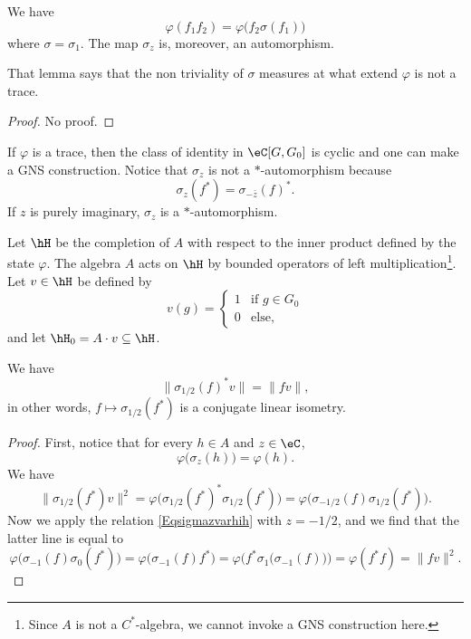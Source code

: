 \begin{lemma}
	We have
	\begin{equation}
		\varphi(f_1f_2)=\varphi\big( f_2\sigma(f_1) \big)
	\end{equation}
	where $\sigma=\sigma_1$. The map $\sigma_z$ is, moreover, an automorphism.
\end{lemma}
That lemma says that the non triviality of $\sigma$ measures at what extend $\varphi$ is not a trace.

\begin{proof}
No proof.
\end{proof}
If $\varphi$ is a trace, then the class of identity in $\eC[G,G_0]$ is cyclic and one can make a GNS construction. Notice that $\sigma_z$ is not a $*$-automorphism because
\begin{equation}
	\sigma_z(f^*)=\sigma_{-\bar z}(f)^*.
\end{equation}
If $z$ is purely imaginary, $\sigma_z$ is a $*$-automorphism.

Let $\hH$ be the completion of $A$ with respect to the inner product defined by the state $\varphi$. The algebra $A$ acts on $\hH$ by bounded operators of left multiplication\footnote{Since $A$ is not a $C^*$-algebra, we cannot invoke a GNS construction here.}. Let $v\in\hH$ be defined by
\begin{equation}
	v(g)=
\begin{cases}
	1&\text{if $g\in G_0$}\\
	0&\text{else},
\end{cases}
\end{equation}
and let $\hH_0=A\cdot v\subseteq\hH$.


\begin{lemma}
	We have
	\begin{equation}
		\| \sigma_{1/2}(f)^*v \|=\| fv \|,
	\end{equation}
	in other words, $f\mapsto \sigma_{1/2}(f^*)$ is a conjugate linear isometry.
\end{lemma}

\begin{proof}
	First, notice that for every $h\in A$ and $z\in \eC$,
	\begin{equation}		\label{Eqsigmazvarhih}
		\varphi\big( \sigma_z(h) \big)=\varphi(h).
	\end{equation}
	We have 
	\begin{equation}
		\| \sigma_{1/2}(f^*)v \|^2=\varphi\big( \sigma_{1/2}(f^*)^*\sigma_{1/2}(f^*) \big)=\varphi\big( \sigma_{-1/2}(f)\sigma_{1/2}(f^*) \big).
	\end{equation}
	Now we apply the relation \eqref{Eqsigmazvarhih} with $z=-1/2$, and we find that the latter line is equal to
	\begin{equation}
		\varphi\big( \sigma_{-1}(f)\sigma_0(f^*) \big)=\varphi\big( \sigma_{-1}(f)f^* \big)=\varphi\Big( f^*\sigma_1\big( \sigma_{-1}(f) \big) \Big)=\varphi(f^*f)=\| fv \|^2.
	\end{equation}
\end{proof}

